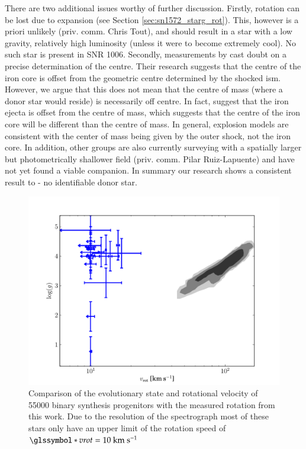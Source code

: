 There are two additional issues worthy of further discussion. Firstly, rotation can be lost due to expansion (see Section \ref{sec:sn1572_starg_rot}). This, however is a priori unlikely (priv. comm. Chris Tout), and should result in a star with a low gravity, relatively high luminosity (unless it were to become extremely cool). No such star is present in SNR 1006. Secondly, measurements by \citet[see Figure \ref{fig:sn1006_uvprobe}]{2005ApJ...624..189W}cast doubt on a precise determination of the centre. Their research suggests that the centre of the iron core is offset from the geometric centre determined by the shocked \gls{ism}. However, we argue that this does not mean that the centre of mass (where a donor star would reside) is necessarily off centre. In fact, \cite{2010ApJ...708.1703M} suggest that the iron ejecta is offset from the centre of mass, which suggests that the centre of the iron core will be different than the centre of mass. In general, explosion models are consistent with the center of  mass being given by the outer shock, not the iron core. In addition, other groups are also currently surveying  with a spatially larger but photometrically shallower field (priv. comm. Pilar Ruiz-Lapuente) and have not yet found a viable companion. In summary our research shows a consistent result to  - no identifiable donor star.

\begin{figure}[tb] %
   \centering
   \includegraphics[width=\textwidth]{chapter_sn1006/plots/compare_vrot.pdf} 
   \caption[Comparison of rotation and surface gravity of SN 1006 candidates]{Comparison of the evolutionary state and rotational velocity of 55000 binary synthesis  progenitors \citep[gray shades;data from][]{2008ApJ...677L.109H} with the measured rotation from this work. Due to the resolution of the spectrograph most of these stars only have an upper limit of the rotation speed of $\vrot=10~\kms$}
   \label{fig:han2008_vrot_compare}
\end{figure}


